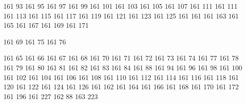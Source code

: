 

 
\startencoding[big5]

 161  93
 161  95
 161  97
 161  99
 161 101
 161 103
 161 105
 161 107
 161 111
 161 111
 161 113
 161 115
 161 117
 161 119
 161 121
 161 123
 161 125
 161 161
 161 163
 161 165
 161 167
 161 169
 161 171

 161  69
 161  75
 161  76

 161  65
 161  66
 161  67
 161  68
 161  70
 161  71
 161  72
 161  73
 161  74
 161  77
 161  78
 161  79
 161  80
 161  81
 161  82
 161  83
 161  84
 161  88
 161  94
 161  96
 161  98
 161 100
 161 102
 161 104
 161 106
 161 108
 161 110
 161 112
 161 114
 161 116
 161 118
 161 120
 161 122
 161 124
 161 126
 161 162
 161 164
 161 166
 161 168
 161 170
 161 172
 161 196
 161 227
 162  88
 163 223

